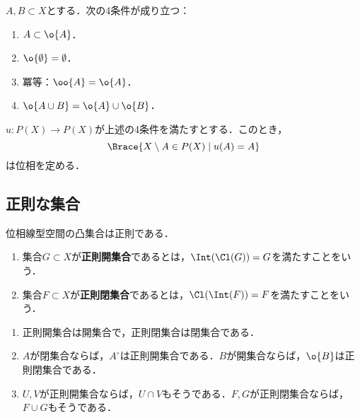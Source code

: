 \documentclass[uplatex,dvipdfmx]{jsreport}
\begin{document}
\begin{proposition}
    $A,B\subset X$とする．次の4条件が成り立つ：
    \begin{enumerate}
        \item $A\subset\o{A}$．
        \item $\o{\emptyset}=\emptyset$．
        \item 冪等：$\oo{A}=\o{A}$．
        \item $\o{A\cup B}=\o{A}\cup\o{B}$．
    \end{enumerate}
\end{proposition}

\begin{theorem}\label{thm-Kuratowski}
    $u:P(X)\to P(X)$が上述の4条件を満たすとする．このとき，
    \[\Brace{X\setminus A\in P(X)\mid u(A)=A}\]
    は位相を定める．
\end{theorem}

\subsection{正則な集合}

\begin{tcolorbox}[colframe=ForestGreen, colback=ForestGreen!10!white,breakable,colbacktitle=ForestGreen!40!white,coltitle=black,fonttitle=\bfseries\sffamily,
title=]
    位相線型空間の凸集合は正則である．
\end{tcolorbox}

\begin{definition}\mbox{}
    \begin{enumerate}
        \item 集合$G\subset X$が\textbf{正則開集合}であるとは，$\Int(\Cl(G))=G$を満たすことをいう．
        \item 集合$F\subset X$が\textbf{正則閉集合}であるとは，$\Cl(\Int(F))=F$を満たすことをいう．
    \end{enumerate}
\end{definition}

\begin{proposition}\mbox{}
    \begin{enumerate}
        \item 正則開集合は開集合で，正則閉集合は閉集合である．
        \item $A$が閉集合ならば，$A^\circ$は正則開集合である．$B$が開集合ならば，$\o{B}$は正則閉集合である．
        \item $U,V$が正則開集合ならば，$U\cap V$もそうである．$F,G$が正則閉集合ならば，$F\cup G$もそうである．
    \end{enumerate}
\end{proposition}
\end{document}
